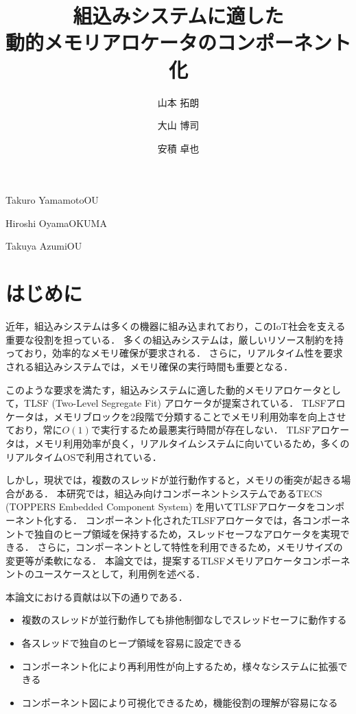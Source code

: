 \documentclass[submit]{ipsj_v2/UTF8/ipsj}
\begin{document}
\title{組込みシステムに適した\\動的メモリアロケータのコンポーネント化}




\author{山本 拓朗}{Takuro Yamamoto}{OU}%
\author{大山 博司}{Hiroshi Oyama}{OKUMA}%
\author{安積 卓也}{Takuya Azumi}{OU}%

\maketitle

\section{はじめに}
近年，組込みシステムは多くの機器に組み込まれており，このIoT社会を支える重要な役割を担っている．
多くの組込みシステムは，厳しいリソース制約を持っており，効率的なメモリ確保が要求される．
さらに，リアルタイム性を要求される組込みシステムでは，メモリ確保の実行時間も重要となる．

このような要求を満たす，組込みシステムに適した動的メモリアロケータとして，TLSF (Two-Level Segregate Fit) アロケータが提案されている．
TLSFアロケータは，メモリブロックを2段階で分類することでメモリ利用効率を向上させており，常に$O(1)$で実行するため最悪実行時間が存在しない．
TLSFアロケータは，メモリ利用効率が良く，リアルタイムシステムに向いているため，多くのリアルタイムOSで利用されている．

しかし，現状では，複数のスレッドが並行動作すると，メモリの衝突が起きる場合がある．
本研究では，組込み向けコンポーネントシステムであるTECS (TOPPERS Embedded Component System) を用いてTLSFアロケータをコンポーネント化する．
コンポーネント化されたTLSFアロケータでは，各コンポーネントで独自のヒープ領域を保持するため，スレッドセーフなアロケータを実現できる．
さらに，コンポーネントとして特性を利用できるため，メモリサイズの変更等が柔軟になる．
本論文では，提案するTLSFメモリアロケータコンポーネントのユースケースとして，利用例を述べる．

本論文における貢献は以下の通りである．
\begin{itemize}
    \item 複数のスレッドが並行動作しても排他制御なしでスレッドセーフに動作する
    \item 各スレッドで独自のヒープ領域を容易に設定できる
    \item コンポーネント化により再利用性が向上するため，様々なシステムに拡張できる
    \item コンポーネント図により可視化できるため，機能役割の理解が容易になる
\end{itemize}
\end{document}

